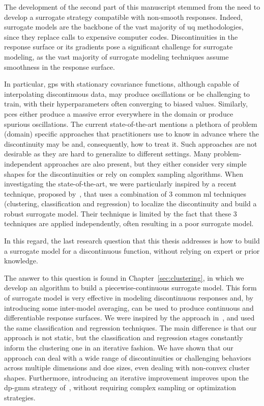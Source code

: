 The development of the second part of this manuscript stemmed from the need to develop a surrogate strategy compatible with non-smooth responses. Indeed, surrogate models are the backbone of the vast majority of \gls{uq} methodologies, since they replace calls to expensive computer codes. Discontinuities in the response surface or its gradients pose a significant challenge for surrogate modeling, as the vast majority of surrogate modeling techniques assume smoothness in the response surface. 

\smallskip
In particular, \glspl{gp} with stationary covariance functions, although capable of interpolating discontinuous data, may produce oscillations or be challenging to train, with their hyperparameters often converging to biased values. Similarly, \glspl{pce} either produce a massive error everywhere in the domain or produce spurious oscillations. The current state-of-the-art mentions a plethora of problem (domain) specific approaches that practitioners use to know in advance where the discontinuity may be and, consequently, how to treat it. Such approaches are not desirable as they are hard to generalize to different settings. Many problem-independent approaches are also present, but they either consider very simple shapes for the discontinuities or rely on complex sampling algorithms. When investigating the state-of-the-art, we were particularly inspired by a recent technique, proposed by~\cite{Sudret2023}, that uses a combination of 3 common \gls{ml} techniques (clustering, classification and regression) to localize the discontinuity and build a robust surrogate model. Their technique is limited by the fact that these 3 techniques are applied independently, often resulting in a poor surrogate model.

\smallskip
In this regard, the last research question that this thesis addresses is how to build a surrogate model for a discontinuous function, without relying on expert or prior knowledge. 

\smallskip
The answer to this question is found in Chapter~\ref{sec:clustering}, in which we develop an algorithm to build a piecewise-continuous surrogate model. This form of surrogate model is very effective in modeling discontinuous responses and, by introducing some inter-model averaging, can be used to produce continuous and differentiable response surfaces. We were inspired by the approach in~\cite{Sudret2023}, and used the same classification and regression techniques. The main difference is that our approach is not static, but the classification and regression stages constantly inform the clustering one in an iterative fashion. We have shown that our approach can deal with a wide range of discontinuities or challenging behaviors across multiple dimensions and \gls{doe} sizes, even dealing with non-convex cluster shapes. Furthermore, introducing an iterative improvement improves upon the \gls{dp}-\gls{gmm} strategy of~\cite{Sudret2023}, without requiring complex sampling or optimization strategies.

